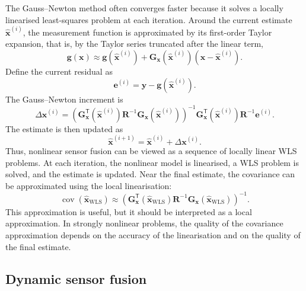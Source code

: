 The Gauss--Newton method often converges faster because it solves a locally linearised least-squares problem at each iteration. Around the current estimate $\widehat{\mathbf{x}}^{(i)}$, the measurement function is approximated by its first-order Taylor expansion, that is, by the Taylor series truncated after the linear term,
\begin{equation}
\mathbf{g}(\mathbf{x}) \approx \mathbf{g} \left( \widehat{\mathbf{x}}^{(i)} \right) + \mathbf{G}_{\mathbf{x}} \left( \widehat{\mathbf{x}}^{(i)} \right) \left( \mathbf{x} - \widehat{\mathbf{x}}^{(i)} \right).
\end{equation}
Define the current residual as
\begin{equation}
\mathbf{e}^{(i)} = \mathbf{y} - \mathbf{g} \left( \widehat{\mathbf{x}}^{(i)} \right).
\end{equation}
The Gauss--Newton increment is
\begin{equation}
\Delta \mathbf{x}^{(i)} = \left( \mathbf{G}_{\mathbf{x}}^{\mathsf T} \left( \widehat{\mathbf{x}}^{(i)} \right) \mathbf{R}^{-1} \mathbf{G}_{\mathbf{x}} \left( \widehat{\mathbf{x}}^{(i)} \right) \right)^{-1} \mathbf{G}_{\mathbf{x}}^{\mathsf T} \left( \widehat{\mathbf{x}}^{(i)} \right) \mathbf{R}^{-1} \mathbf{e}^{(i)}.
\end{equation}
The estimate is then updated as
\begin{equation}
\widehat{\mathbf{x}}^{(i+1)} = \widehat{\mathbf{x}}^{(i)} + \Delta \mathbf{x}^{(i)}.
\end{equation}
Thus, nonlinear sensor fusion can be viewed as a sequence of locally linear WLS problems. At each iteration, the nonlinear model is linearised, a WLS problem is solved, and the estimate is updated. Near the final estimate, the covariance can be approximated using the local linearisation:
\begin{equation}
\operatorname{cov} \left( \widehat{\mathbf{x}}_{\mathrm{WLS}} \right) \approx \left(\mathbf{G}_{\mathbf{x}}^{\mathsf T}\left(\widehat{\mathbf{x}}_{\mathrm{WLS}}\right) \mathbf{R}^{-1} \mathbf{G}_{\mathbf{x}} \left( \widehat{\mathbf{x}}_{\mathrm{WLS}} \right)\right)^{-1}.
\end{equation}
This approximation is useful, but it should be interpreted as a local approximation. In strongly nonlinear problems, the quality of the covariance approximation depends on the accuracy of the linearisation and on the quality of the final estimate.

\subsection{Dynamic sensor fusion}

